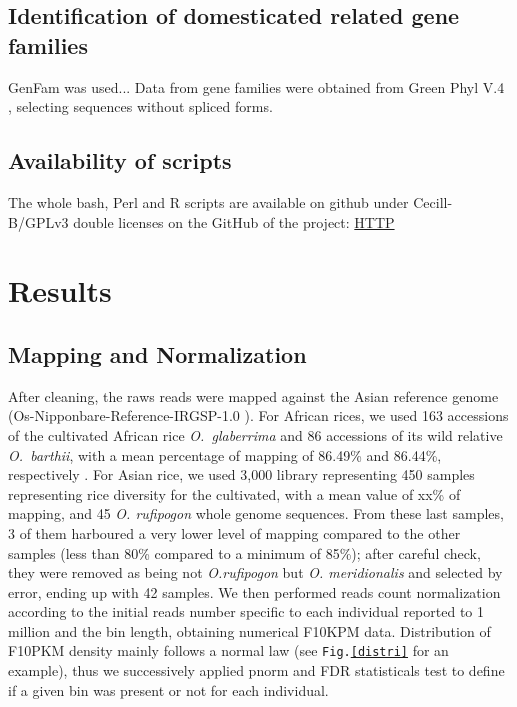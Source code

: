 \documentclass[10pt,letterpaper]{article}
\begin{document}
  \subsection*{Identification of domesticated related gene families}
  GenFam was used...
  Data from gene families were obtained from Green Phyl V.4  \cite{Conte2008b, Conte2008a, Rouard2011}, selecting sequences without spliced forms.
  
  \subsection*{Availability of scripts}
  The whole bash, Perl and R scripts are available on github under Cecill-B/GPLv3 double licenses on the GitHub of the project: \url{HTTP}

\section*{Results}
\subsection*{Mapping and Normalization}
After cleaning, the raws reads were mapped against the Asian reference genome (Os-Nipponbare-Reference-IRGSP-1.0 \cite{Mcnally2009, Kawahara2013}). For African rices, we used 163 accessions of the cultivated African rice \textit{O.~glaberrima} and 86 accessions of its wild relative \textit{O.~barthii}, with a mean percentage of mapping of 86.49\% and 86.44\%, respectively \cite{Cubry2018}. For Asian rice, we used 3,000 library representing 450 samples representing rice diversity for the cultivated, with a mean value of xx\% of mapping, and 45 \textit{O. rufipogon} whole genome sequences. From these last samples, 3 of them harboured a very lower level of mapping compared to the other samples (less than 80\% compared to a minimum of 85\%); after careful check, they were removed as being not \textit{O.rufipogon} but \textit{O. meridionalis} and selected by error, ending up with 42 samples. We then performed reads count normalization according to the initial reads number specific to each individual reported to 1 million and the bin length, obtaining numerical F10KPM data. Distribution of F10PKM density mainly follows a normal law (see \texttt{Fig.\ref{distri}} for an example), thus we successively applied pnorm and FDR statisticals test to define if a given bin was present or not for each individual.
\end{document}
